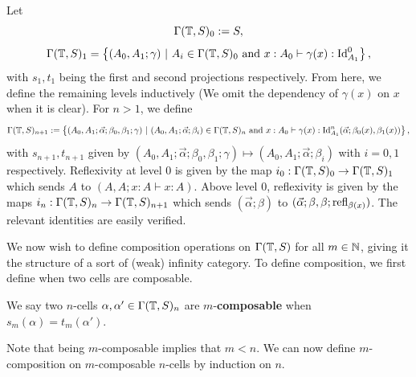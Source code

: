 \documentclass{article}
\begin{document}
\begin{defn}
    Let
    $$ \Gamma(\mathbb{T},S)_0:=S, $$
    $$ \Gamma(\T,S)_1=\left\{(A_0,A_1;\gamma)\ |\ A_i\in\Gamma(\T,S)_0\text{ and }x:A_0\vdash\gamma(x):\Id^0_{A_1}\right\}, $$
    with $s_1,t_1$ being the first and second projections respectively. From here, we define the remaining levels inductively (We omit the dependency of $\gamma(x)$ on $x$ when it is clear). For $n>1$, we define
    $$ \Gamma(\T,S)_{n+1}:=\left\{(A_0,A_1;\vec{\alpha};\beta_0,\beta_1;\gamma)\ |\ (A_0,A_1;\vec{\alpha};\beta_i)\in\Gamma(\T,S)_n\text{ and }x:A_0\vdash\gamma(x):\Id_{A_1}^{n}(\vec{\alpha};\beta_0(x),\beta_1(x))\right\}, $$
    with $s_{n+1},t_{n+1}$ given by $(A_0,A_1;\vec{\alpha};\beta_0,\beta_1;\gamma)\mapsto(A_0,A_1;\vec{\alpha};\beta_i)$ with $i=0,1$ respectively. Reflexivity at level 0 is given by the map $i_0:\Gamma(\mathbb{T},S)_0\to\Gamma(\mathbb{T},S)_1$ which sends $A$ to  $(A,A;x:A\vdash x:A)$. Above level 0, reflexivity is given by the maps $i_n:\Gamma(\mathbb{T},S)_n\to\Gamma(\mathbb{T},S)_{n+1}$ which sends $(\vec{\alpha};\beta)$ to $(\vec{\alpha};\beta,\beta;\operatorname{refl}_{\beta(x)})$. The relevant identities are easily verified.
\end{defn}

We now wish to define composition operations on $\Gamma(\mathbb{T},S)$ for all $m\in\mathbb{N}$, giving it the structure of a sort of (weak) infinity category. To define composition, we first define when two cells are composable.

\begin{defn}
    We say two $n$-cells $\alpha,\alpha'\in\Gamma(\mathbb{T},S)_n$ are $m$-\textbf{composable} when $s_m(\alpha)=t_m(\alpha')$.
\end{defn}

Note that being $m$-composable implies that $m<n$. We can now define $m$-composition on $m$-composable $n$-cells by induction on $n$.
\end{document}
